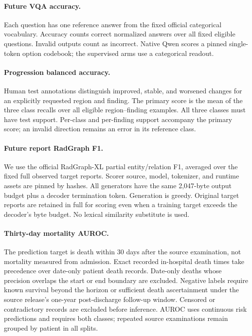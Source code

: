 \paragraph{Future VQA accuracy.}
Each question has one reference answer from the fixed official categorical
vocabulary. Accuracy counts correct normalized answers over all fixed eligible
questions. Invalid outputs count as incorrect. Native Qwen scores a pinned
single-token option codebook; the supervised arms use a categorical readout.

\paragraph{Progression balanced accuracy.}
Human test annotations distinguish improved, stable, and worsened changes for
an explicitly requested region and finding. The primary score is the mean of
the three class recalls over all eligible region--finding examples. All three
classes must have test support. Per-class and per-finding support accompany the
primary score; an invalid direction remains an error in its reference class.

\paragraph{Future report RadGraph F1.}
We use the official RadGraph-XL partial entity/relation F1, averaged over the
fixed full observed target reports. Scorer source, model, tokenizer, and runtime
assets are pinned by hashes. All generators have the same 2,047-byte output
budget plus a decoder termination token. Generation is greedy. Original target
reports are retained in full for scoring even when a training target exceeds
the decoder's byte budget. No lexical similarity substitute is used.

\paragraph{Thirty-day mortality AUROC.}
The prediction target is death within 30 days after the source examination,
not mortality measured from admission. Exact recorded in-hospital death times
take precedence over date-only patient death records. Date-only deaths whose
precision overlaps the start or end boundary are excluded. Negative labels
require known survival beyond the horizon or sufficient death ascertainment
under the source release's one-year post-discharge follow-up window. Censored
or contradictory records are excluded before inference. AUROC uses continuous
risk predictions and requires both classes; repeated source examinations
remain grouped by patient in all splits.

